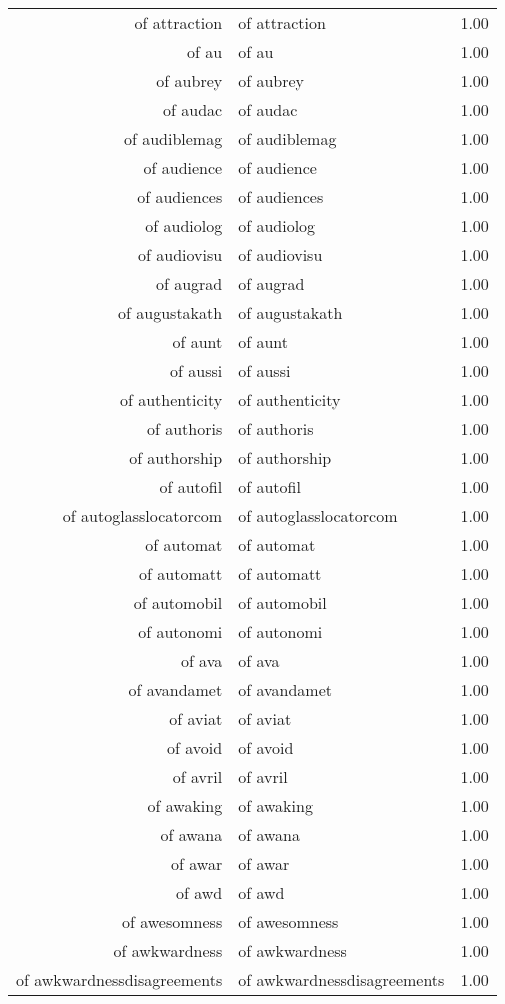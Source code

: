 \begin{table}[ht]
\begin{tabular}{rlr}
  of attraction & of attraction & 1.00 \\ 
  of au & of au & 1.00 \\ 
  of aubrey & of aubrey & 1.00 \\ 
  of audac & of audac & 1.00 \\ 
  of audiblemag & of audiblemag & 1.00 \\ 
  of audience & of audience & 1.00 \\ 
  of audiences & of audiences & 1.00 \\ 
  of audiolog & of audiolog & 1.00 \\ 
  of audiovisu & of audiovisu & 1.00 \\ 
  of augrad & of augrad & 1.00 \\ 
  of augustakath & of augustakath & 1.00 \\ 
  of aunt & of aunt & 1.00 \\ 
  of aussi & of aussi & 1.00 \\ 
  of authenticity & of authenticity & 1.00 \\ 
  of authoris & of authoris & 1.00 \\ 
  of authorship & of authorship & 1.00 \\ 
  of autofil & of autofil & 1.00 \\ 
  of autoglasslocatorcom & of autoglasslocatorcom & 1.00 \\ 
  of automat & of automat & 1.00 \\ 
  of automatt & of automatt & 1.00 \\ 
  of automobil & of automobil & 1.00 \\ 
  of autonomi & of autonomi & 1.00 \\ 
  of ava & of ava & 1.00 \\ 
  of avandamet & of avandamet & 1.00 \\ 
  of aviat & of aviat & 1.00 \\ 
  of avoid & of avoid & 1.00 \\ 
  of avril & of avril & 1.00 \\ 
  of awaking & of awaking & 1.00 \\ 
  of awana & of awana & 1.00 \\ 
  of awar & of awar & 1.00 \\ 
  of awd & of awd & 1.00 \\ 
  of awesomness & of awesomness & 1.00 \\ 
  of awkwardness & of awkwardness & 1.00 \\ 
  of awkwardnessdisagreements & of awkwardnessdisagreements & 1.00 \\ 

\end{tabular}
\end{table}
